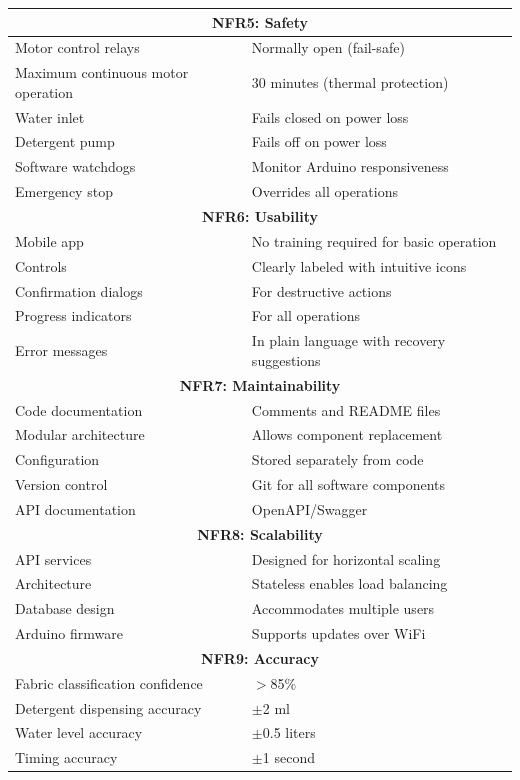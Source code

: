 \begin{center}
\begin{longtable}{|p{3.5cm}|p{10cm}|}
\multicolumn{2}{|c|}{\textbf{NFR5: Safety}} \\
\hline
Motor control relays & Normally open (fail-safe) \\
\hline
Maximum continuous motor operation & 30 minutes (thermal protection) \\
\hline
Water inlet & Fails closed on power loss \\
\hline
Detergent pump & Fails off on power loss \\
\hline
Software watchdogs & Monitor Arduino responsiveness \\
\hline
Emergency stop & Overrides all operations \\
\hline

\multicolumn{2}{|c|}{\textbf{NFR6: Usability}} \\
\hline
Mobile app & No training required for basic operation \\
\hline
Controls & Clearly labeled with intuitive icons \\
\hline
Confirmation dialogs & For destructive actions \\
\hline
Progress indicators & For all operations \\
\hline
Error messages & In plain language with recovery suggestions \\
\hline

\multicolumn{2}{|c|}{\textbf{NFR7: Maintainability}} \\
\hline
Code documentation & Comments and README files \\
\hline
Modular architecture & Allows component replacement \\
\hline
Configuration & Stored separately from code \\
\hline
Version control & Git for all software components \\
\hline
API documentation & OpenAPI/Swagger \\
\hline

\multicolumn{2}{|c|}{\textbf{NFR8: Scalability}} \\
\hline
API services & Designed for horizontal scaling \\
\hline
Architecture & Stateless enables load balancing \\
\hline
Database design & Accommodates multiple users \\
\hline
Arduino firmware & Supports updates over WiFi \\
\hline

\multicolumn{2}{|c|}{\textbf{NFR9: Accuracy}} \\
\hline
Fabric classification confidence & $>$85\% \\
\hline
Detergent dispensing accuracy & $\pm$2 ml \\
\hline
Water level accuracy & $\pm$0.5 liters \\
\hline
Timing accuracy & $\pm$1 second \\
\hline


\end{longtable}
\end{center}
